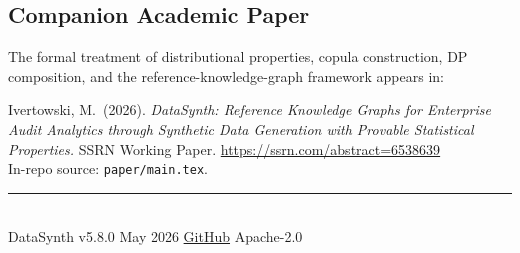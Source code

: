 \documentclass[11pt,a4paper]{article}
\newcommand{\dsversion}{5.8.0}
\newcommand{\dsdate}{May 2026}
\newcommand{\dsrepourl}{https://github.com/mivertowski/SyntheticData}
\newcommand{\dsssrnurl}{https://ssrn.com/abstract=6538639}
\begin{document}
\subsection{Companion Academic Paper}

The formal treatment of distributional properties, copula construction,
DP composition, and the reference-knowledge-graph framework appears in:

\begin{tcolorbox}[notebox={Citation}]
\small
Ivertowski, M.\ (2026).
\textit{DataSynth: Reference Knowledge Graphs for Enterprise Audit Analytics
through Synthetic Data Generation with Provable Statistical Properties.}
SSRN Working Paper. \url{\dsssrnurl}
\\[2pt]
In-repo source: \texttt{paper/main.tex}.
\end{tcolorbox}




\vspace*{\fill}
\begin{center}
\rule{0.5\textwidth}{0.4pt}\\[0.6em]
\textcolor{midgray}{\small
  DataSynth v\dsversion{} \textbullet{}
  \dsdate{} \textbullet{}
  \href{\dsrepourl}{GitHub}
  \textbullet{}
  Apache-2.0
}
\end{center}
\end{document}
